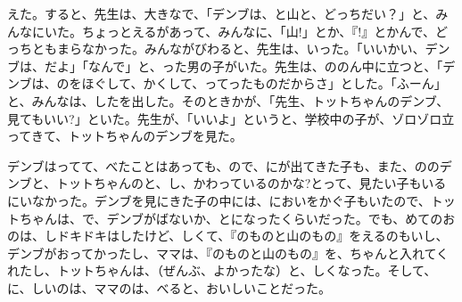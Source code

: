 えた。すると、先生は、大きなで、「デンブは、と山と、どっちだい？」と、みんなにいた。ちょっとえるがあって、みんなに、「山!」とか、『!』とかんで、どっちともまらなかった。みんながびわると、先生は、いった。「いいかい、デンブは、だよ」「なんで」と、った男の子がいた。先生は、ののん中に立つと、「デンブは、のをほぐして、かくして、ってったものだからさ」とした。「ふーん」と、みんなは、したを出した。そのときかが、「先生、トットちゃんのデンブ、見てもいい?」といた。先生が、「いいよ」というと、学校中の子が、ゾロゾロ立ってきて、トットちゃんのデンブを見た。

デンブはってて、べたことはあっても、ので、にが出てきた子も、また、ののデンブと、トットちゃんのと、し、かわっているのかな?とって、見たい子もいるにいなかった。デンブを見にきた子の中には、においをかぐ子もいたので、トットちゃんは、で、デンブがばないか、とになったくらいだった。でも、めてのおのは、しドキドキはしたけど、しくて、『のものと山のもの』をえるのもいし、デンブがおってかったし、ママは、『のものと山のもの』を、ちゃんと入れてくれたし、トットちゃんは、（ぜんぶ、よかったな）と、しくなった。そして、に、しいのは、ママのは、べると、おいしいことだった。


